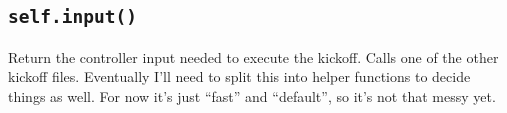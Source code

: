 \documentclass{article}
\newcommand{\method}[1]{\subsection{\texttt{self.#1}}}
\begin{document}
\begin{flushleft}
{        \method{input()}
               {
                 Return the controller input needed to execute the kickoff.  Calls one of the other kickoff files.  Eventually I'll need to split this into helper functions to decide things as well.  For now it's just ``fast'' and ``default'', so it's not that messy yet.
               }


      }

      







































  
  





\end{flushleft}
\end{document}
